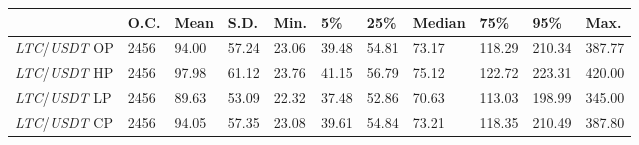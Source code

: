 \begin{tabular}{lllllllllll}
\toprule
 & \textbf{O.C.} & \textbf{Mean} & \textbf{S.D.} & \textbf{Min.} & \textbf{5\%} & \textbf{25\%} & \textbf{Median} & \textbf{75\%} & \textbf{95\%} & \textbf{Max.} \\
\midrule
\emph{LTC}/\emph{USDT} OP & 2456 & 94.00 & 57.24 & 23.06 & 39.48 & 54.81 & 73.17 & 118.29 & 210.34 & 387.77 \\
\emph{LTC}/\emph{USDT} HP & 2456 & 97.98 & 61.12 & 23.76 & 41.15 & 56.79 & 75.12 & 122.72 & 223.31 & 420.00 \\
\emph{LTC}/\emph{USDT} LP & 2456 & 89.63 & 53.09 & 22.32 & 37.48 & 52.86 & 70.63 & 113.03 & 198.99 & 345.00 \\
\emph{LTC}/\emph{USDT} CP & 2456 & 94.05 & 57.35 & 23.08 & 39.61 & 54.84 & 73.21 & 118.35 & 210.49 & 387.80 \\
\bottomrule
\end{tabular}
